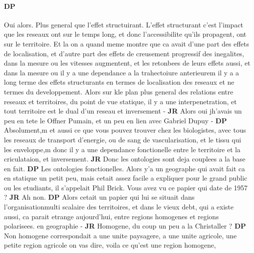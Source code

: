 \documentclass[12pt]{article}
\begin{document}
\paragraph{DP}

Oui alors. Plus general que l'effet structuirant. L'effet structurant c'est l'impact que les reseaux ont sur le temps long, et donc l'accessibilite qu'ils propagent, ont sur le territoire. Et la on a quand meme montre que ca avait d'une part des effets de localisation, et d'autre part des effets de creusement progressif des inegalites, dans la mesure ou les vitesses augmentent, et les retonbees de leurs effets aussi, et dans la mesure ou il y a une dependance a la trahectoiure anterieurem il y a a long terme des effets structurants en termes de localisation des reseaux et ne termes du developpement. Alors sur kle plan plus general des relations entre reseaux et territoires, du point de vue statique, il y a une interpenetration, et tout territoire est le dual d'un reseau et inversement - \textbf{JR} Alors oui jh'avais un peu en tete le Offner Pumain, et un peu en lien avec Gabriel Dupuy - \textbf{DP} Absolument,m et aussi ce que vous pouvez trouver chez les biologistes, avec tous les reseaux de transport d'energie, ou de sang de vascularisation, et le tissu qui les enveloppe,m donc il y a une dependance fonctionelle entre le territoire et la criculataion, et inversement. \textbf{JR} Donc les ontologies sont deja couplees a la base en fait. \textbf{DP} Les ontologies fonctionelles. Alors y'a un geographe qui avait fait ca en statique un petit peu, mais cetait assez facile a expliquer pour le grand public ou les etudiants, il s'appelait Phil Brick. Vous avez vu ce papier qui date de 1957 ? \textbf{JR} Ah non. \textbf{DP} Alors cetait un papier qui lui se situait dans l'organisationmulti scalaire des territoires, et dans le vieux debt, qui a existe aussi, ca parait etrange aujourd'hui, entre regions homogenes et regions polarisees. en geographie -  \textbf{JR} Homogene, du coup un peu a la Christaller ? \textbf{DP} Non homogene correspondait a une unite paysagere, a une unite agricole, une petite region agricole on vas dire, voila ce qu'est une region homogene, 
\end{document}
